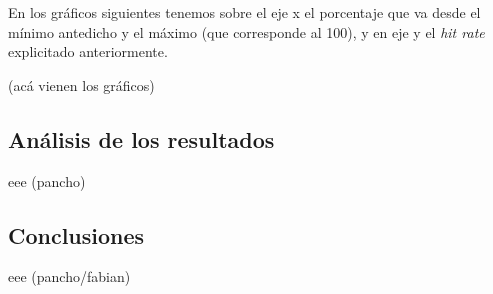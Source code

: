 En los gr\'aficos siguientes tenemos sobre el eje x el porcentaje que va desde el m\'inimo antedicho y el m\'aximo (que corresponde al 100), y en eje y el \textit{hit rate} explicitado anteriormente. 

(ac\'a vienen los gr\'aficos)
\subsection{An\'alisis de los resultados}
eee (pancho)

\subsection{Conclusiones}
eee (pancho/fabian)
